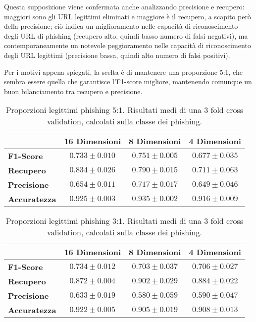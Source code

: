 \documentclass[../../main.tex]{subfiles}
\begin{document}
    Questa supposizione viene confermata anche analizzando precisione e recupero: maggiori sono gli URL legittimi eliminati e maggiore è il recupero, a scapito però della precisione; ciò indica un miglioramento nelle capacità di riconoscimento degli URL di phishing (recupero alto, quindi basso numero di falsi negativi), ma contemporaneamente un notevole peggioramento nelle capacità di riconoscimento degli URL legittimi (precisione bassa, quindi alto numero di falsi positivi).

    Per i motivi appena spiegati, la scelta è di mantenere una proporzione 5:1, che sembra essere quella che garantisce l'F1-score migliore, mantenendo comunque un buon bilanciamento tra recupero e precisione.


    \begin{table}[H]
        \centering
        \begin{tabular}{lccc}
            \toprule
            {} &                      \textbf{16 Dimensioni} & \textbf{8 Dimensioni} & \textbf{4 Dimensioni} \\
            \midrule
            \textbf{F1-Score }      &      $0.733 \pm 0.010$ & $0.751 \pm 0.005$ & $0.677 \pm 0.035$\\
            \textbf{Recupero   }    &      $0.834 \pm 0.026$ & $0.790 \pm 0.015$ & $0.711 \pm 0.063$\\
            \textbf{Precisione}     &      $0.654 \pm 0.011$ & $0.717 \pm 0.017$ & $0.649 \pm 0.046$\\
            \textbf{Accuratezza }   &      $0.925 \pm 0.003$ & $0.935 \pm 0.002$ & $0.916 \pm 0.009$\\
            \bottomrule
        \end{tabular}
        \caption{Proporzioni legittimi phishing 5:1. Risultati medi di una 3 fold cross validation, calcolati sulla classe dei phishing.}
        \label{tab:5a1Undersampling}
    \end{table}

    \begin{table}[H]
        \centering
        \begin{tabular}{lccc}
            \toprule
            {} &                      \textbf{16 Dimensioni} & \textbf{8 Dimensioni} & \textbf{4 Dimensioni} \\
            \midrule
            \textbf{F1-Score }      &      $0.734 \pm 0.012$ & $0.703 \pm 0.037$ & $0.706 \pm 0.027$\\
            \textbf{Recupero   }    &      $0.872 \pm 0.004$ & $0.902 \pm 0.029$ & $0.884 \pm 0.022$\\
            \textbf{Precisione}     &      $0.633 \pm 0.019$ & $0.580 \pm 0.059$ & $0.590 \pm 0.047$\\
            \textbf{Accuratezza }   &      $0.922 \pm 0.005$ & $0.905 \pm 0.019$ & $0.908 \pm 0.013$\\
            \bottomrule
        \end{tabular}     
        \caption{Proporzioni legittimi phishing 3:1. Risultati medi di una 3 fold cross validation, calcolati sulla classe dei phishing.}   
        \label{tab:3a1Undersampling}
    \end{table}
\end{document}
